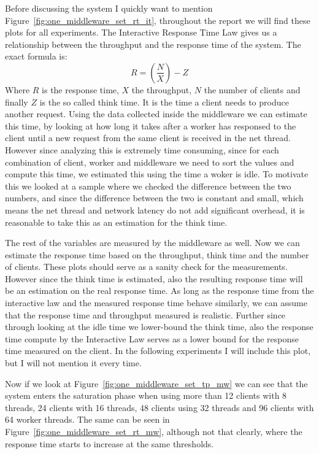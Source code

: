 \documentclass[11pt,a4paper]{article}
\begin{document}
%
Before discussing the system I quickly want to mention Figure~\ref{fig:one_middleware_set_rt_it}, throughout the report we will find these plots for all experiments.
%
The Interactive Response Time Law gives us a relationship between the throughput and the response time of the system. The exact formula is:
%
\[
R = \left(\frac{N}{X}\right) - Z
\]
%
Where $R$ is the response time, $X$ the throughput, $N$ the number of clients and finally $Z$ is the so called think time.
%
It is the time a client needs to produce another request.
%
Using the data collected inside the middleware we can estimate this time, by looking at how long it takes after a worker has responsed to the client until a new request from the same client is received in the net thread.
%
However since analyzing this is extremely time consuming, since for each combination of client, worker and middleware we need to sort the values and compute this time, we estimated this using the time a woker is idle.
%
To motivate this we looked at a sample where we checked the difference between the two numbers, and since the difference between the two is constant and small, which means the net thread and network latency do not add significant overhead, it is reasonable to take this as an estimation for the think time.
%
\par
%
The rest of the variables are measured by the middleware as well.
%
Now we can estimate the response time based on the throughput, think time and the number of clients.
%
These plots should serve as a sanity check for the measurements.
%
However since the think time is estimated, also the resulting response time will be an estimation on the real response time.
%
As long as the response time from the interactive law and the measured response time behave similarly, we can assume that the response time and throughput measured is realistic.
%
Further since through looking at the idle time we lower-bound the think time, also the response time compute by the Interactive Law serves as a lower bound for the response time measured on the client.
%
In the following experiments I will include this plot, but I will not mention it every time.
%
\par
%
Now if we look at Figure~\ref{fig:one_middleware_set_tp_mw} we can see that the system enters the saturation phase when using more than 12 clients with 8 threads, 24 clients with 16 threads, 48 clients using 32 threads and 96 clients with 64 worker threads.
%
The same can be seen in Figure~\ref{fig:one_middleware_set_rt_mw}, although not that clearly, where the response time starts to increase at the same thresholds.
\end{document}
